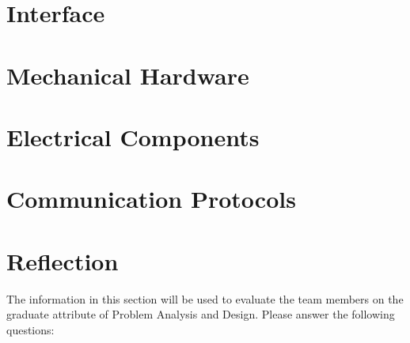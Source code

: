 \documentclass[12pt, titlepage]{article}
\begin{document}

% 

\newpage{}

\appendix

\section{Interface}


\section{Mechanical Hardware}

\section{Electrical Components}

\section{Communication Protocols}

\section{Reflection}

The information in this section will be used to evaluate the team members on the
graduate attribute of Problem Analysis and Design.  Please answer the following questions:
\end{document}
